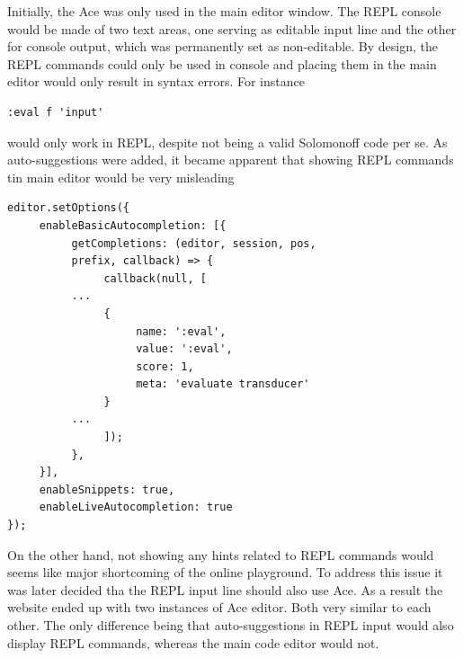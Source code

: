 Initially, the Ace  was only used in the main editor window. The REPL console would be made of two text areas, one serving as editable input line and the other for console output, which was permanently set as non-editable. By design, the REPL commands could only be used in console and placing them in the main editor would only result in syntax errors. For instance
\begin{lstlisting}
:eval f 'input'
\end{lstlisting}
would only work in REPL, despite not being a valid Solomonoff code per se. As auto-suggestions were added, it became apparent that showing  REPL commands tin main editor would be very misleading
\begin{lstlisting}
editor.setOptions({
     enableBasicAutocompletion: [{
          getCompletions: (editor, session, pos,
          prefix, callback) => {
               callback(null, [
          ... 
               {
                    name: ':eval',
                    value: ':eval',
                    score: 1,
                    meta: 'evaluate transducer'
               }
          ...
               ]);
          },
     }],
     enableSnippets: true,
     enableLiveAutocompletion: true
});
\end{lstlisting}
On the other hand, not showing any hints related to REPL commands would seems like major shortcoming of the online playground. To address this issue it was later decided tha the REPL input line should also use Ace. As a result the website ended up with two instances of Ace editor. Both very similar to each other. The only difference being that auto-suggestions in REPL input would also display REPL commands, whereas the main code editor would not.

